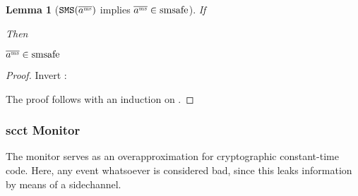 \documentclass[a4paper,names,dvipsnames]{article}
\newtheorem{lemma}{Lemma}
\begin{document}
\begin{lemma}[$\texttt{SMS}(\overline{a^{\text{\tiny ms}}})$ implies $\overline{a^{\text{\tiny ms}}}\in\operatorname{smsafe}$]\label{lem:smssafe-tracesms}
  If
  Then
  \begin{goals}
    \item $\overline{a^{\text{\tiny ms}}}\in\operatorname{smsafe}$
  \end{goals}
\end{lemma}
\begin{proof}
  Invert :
  The proof follows with an induction on .
\end{proof}

\subsubsection{\gls*{scct} Monitor}
The \sCCT monitor serves as an overapproximation for cryptographic constant-time code.
Here, any event whatsoever is considered bad, since this leaks information by means of a sidechannel.
\end{document}
